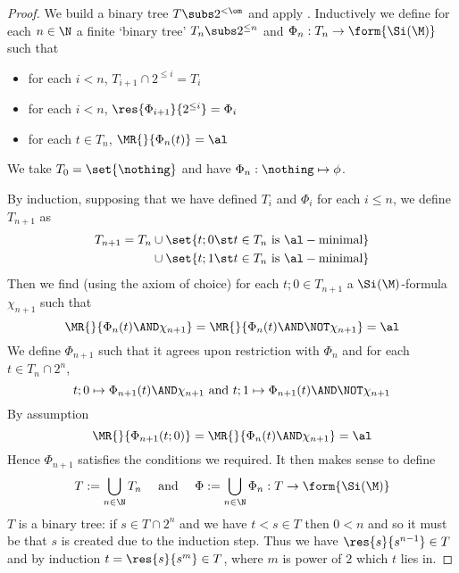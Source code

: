 \begin{proof}
    We build a binary tree $T \subs 2^{<\om}$ and apply 
    .
    Inductively we define for each $n \in \N$ a finite `binary tree' 
    $T_n \subs 2^{\leq n}$ and $\Phi_n : T_n \to \form{\Si(\M)}$
    such that \begin{itemize}
        \item for each $i < n$, $T_{i+1} \cap 2^{\leq i} = T_i$
        \item for each $i < n$, $\res{\Phi_{i+1}}{2^{\leq i}} = \Phi_i$
        \item for each $t \in T_n$, $\MR{}{\Phi_n(t)} = \al$
    \end{itemize}
    We take $T_0 = \set{\nothing}$ and have $\Phi_n : \nothing \mapsto \phi$.

    By induction, supposing that we have defined $T_i$ and $\Phi_i$ for 
    each $i \leq n$, we define $T_{n+1}$ as
    \begin{align*}
        T_{n+1} = T_n &\cup 
        \set{t;0 \st t \in T_n \text{ is } \al-\text{minimal}}\\
        &\cup \set{t;1 \st t \in T_n \text{ is } \al-\text{minimal}}
    \end{align*}
    Then we find (using the axiom of choice) for each $t;0 \in T_{n+1}$
    a $\Si(\M)$-formula $\chi_{n+1}$ such that 
    \[
        \MR{}{\Phi_n(t) \AND \chi_{n+1}} = 
        \MR{}{\Phi_n(t) \AND \NOT \chi_{n+1}} = \al
    \]
    We define $\Phi_{n+1}$ such that it agrees upon restriction with $\Phi_n$
    and for each $t \in T_n \cap 2^{n}$,
    \[t;0 \mapsto \Phi_{n+1}(t) \AND \chi_{n+1}
    \text{ and } t;1 \mapsto \Phi_{n+1}(t) \AND \NOT \chi_{n+1}\]
    By assumption
    \[\MR{}{\Phi_{n+1}(t;0)} = \MR{}{\Phi_{n}(t) \AND \chi_{n+1}} = \al\]
    Hence $\Phi_{n+1}$ satisfies the conditions we required.
    It then makes sense to define 
    \[  
        T := \bigcup_{n \in \N} T_n \quad \text{ and } \quad
        \Phi := \bigcup_{n \in \N} \Phi_n : T \to \form{\Si(\M)} 
    \]
    $T$ is a binary tree:
    if $s \in T \cap 2^{n}$ and we have $t < s \in T$ then $0 < n$
    and so it must be that $s$ is created due to the induction step.
    Thus we have $\res{s}{s^{n-1}} \in T$ and by induction 
    $t = \res{s}{s^m} \in T$, where $m$ is power of $2$ which $t$ lies in.


\end{proof}
